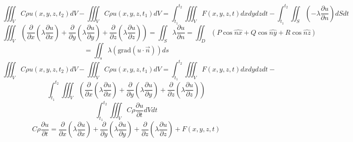 \documentclass[a4paper]{article}
\theoremstyle{definition}
\begin{document}
\[
    \iiint_V C \rho u(x,y,z,t_2) dV - \iiint_V C \rho u(x,y,z,t_1) dV =
    \int_{t_1}^{t_2} \iiint_V F(x,y,z,t) dx dy dz dt -
    \int_{t_1}^{t_2} \iint_S \left(-\lambda \frac{\partial u}{\partial n} \right) dS dt
\]
\[
    \iiint_V \left( \frac{\partial}{\partial x} 
        \left(\lambda \frac{\partial u}{\partial x}\right) +
    \frac{\partial}{\partial y} 
            \left(\lambda \frac{\partial u}{\partial y}\right) +
    \frac{\partial}{\partial z} 
            \left(\lambda \frac{\partial u}{\partial z}\right) 
    \right)
    = \iint_S \lambda \frac{\partial u}{\partial n} 
    = \iint_D (P \cos \hat{nx} + Q \cos \hat{ny} + R \cos \hat{nz})
\]
\[
    = \iint_s \lambda (\text{grad}(u \cdot \vec{n})) ds
\]
\[
    \iiint_V C \rho u(x,y,z,t_2) dV - \iiint_V C \rho u(x,y,z,t_1) dV =
    \int_{t_1}^{t_2} \iiint_V F(x,y,z,t) dx dy dz dt -
\]
    \[
    \int_{t_1}^{t_2} 
    \iiint_V \left( \frac{\partial}{\partial x} 
        \left(\lambda \frac{\partial u}{\partial x}\right) +
    \frac{\partial}{\partial y} 
            \left(\lambda \frac{\partial u}{\partial y}\right) +
    \frac{\partial}{\partial z} 
            \left(\lambda \frac{\partial u}{\partial z}\right) 
    \right)
\]
\[
    \int_{t_1}^{t_2} \iiint_V C \rho \frac{\partial u}{\partial t} dV dt
\]
\[
    C \rho \frac{\partial u}{\partial t} = 
    \frac{\partial}{\partial x} 
            \left(\lambda \frac{\partial u}{\partial x}\right) +
        \frac{\partial}{\partial y} 
                \left(\lambda \frac{\partial u}{\partial y}\right) +
        \frac{\partial}{\partial z} 
                \left(\lambda \frac{\partial u}{\partial z}\right) 
    + F(x,y,z,t)
\]
\end{document}

